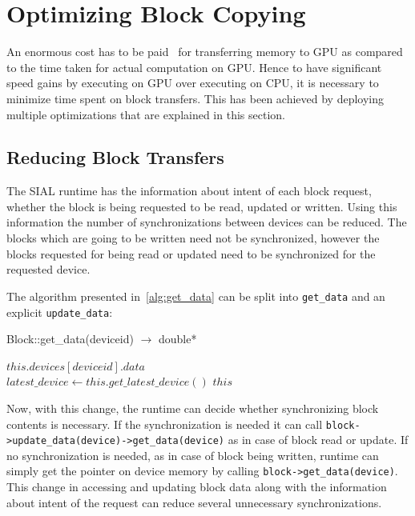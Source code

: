 \section{Optimizing Block Copying}
An enormous cost has to be paid~\cite{Bakkum2010}\cite{memorytransferoverhead}
for transferring memory to GPU as compared to the time taken for actual computation
on GPU. Hence to have significant speed gains by executing on GPU over executing
on CPU, it is necessary to minimize time spent on block transfers. This has been
achieved by deploying multiple optimizations that are explained in this section.

\subsection{Reducing Block Transfers}
The SIAL runtime has the information about intent of each block request, whether
the block is being requested to be read, updated or written. Using this information the
number of synchronizations between devices can be reduced. The blocks which are
going to be written need not be synchronized, however the blocks requested for
being read or updated need to be synchronized for the requested device.

The algorithm presented in~\ref{alg:get_data} can be split into
\texttt{get\_data} and an explicit \texttt{update\_data}:

\begin{algorithm}  {Block::get\_data(deviceid) $\rightarrow$ double*}
  \singlespacing

  \begin{algorithmic}[1]
    \State \Return $this.devices[deviceid].data$
    \EndFunction
    \\
    \State $latest\_device \gets this.get\_latest\_device()$
    \EndIf
    \State \Return $this$
    \EndFunction
  \end{algorithmic}
\end{algorithm}

Now, with this change, the runtime can decide whether synchronizing block contents
is necessary. If the synchronization is needed it can call
\texttt{block->update\_data(device)->get\_data(device)}
as in case of block read or update. If no synchronization is needed, as in case
of block being written, runtime can simply get the pointer on device memory by calling
\texttt{block->get\_data(device)}.
This change in accessing and updating block data along with the information
about intent of the request can reduce several unnecessary synchronizations.

